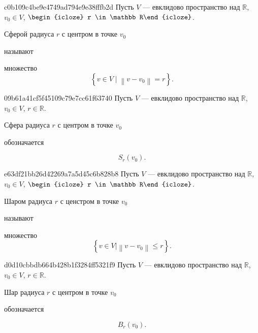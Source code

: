 \begin{note}{c0b109c4be9e4749ad794e9e38fffb2d}
    Пусть \({ V }\) --- евклидово пространство над \({ \mathbb R }\),\: \({ v_0 \in V }\),\: \({ \begin{icloze}{3}r \in \mathbb R\end{icloze} }\).
    \begin{icloze}{2}Сферой радиуса \({ r }\) с центром в точке \({ v_0 }\)\end{icloze} называют \begin{icloze}{1}множество
    \[
        \left\{ v \in V \mid \left\lVert v - v_0 \right\rVert = r \right\}.
    \]
\end{icloze}\end{note}

\begin{note}{09b61a41cf5f45109c79e7cc61f63740}
    Пусть \({ V }\) --- евклидово пространство над \({ \mathbb R }\),\: \({ v_0 \in V }\),\: \({ r \in \mathbb R }\).
    \begin{icloze}{2}Сфера радиуса \({ r }\) с центром в точке \({ v_0 }\)\end{icloze} обозначается
    \begin{icloze}{1}
        \[
            S_r (v_0).
        \]
    \end{icloze}
\end{note}

\begin{note}{e63df21bb26d42269a7a5d45c6b828b8}
    Пусть \({ V }\) --- евклидово пространство над \({ \mathbb R }\),\: \({ v_0 \in V }\),\: \({ \begin{icloze}{3}r \in \mathbb R\end{icloze} }\).
    \begin{icloze}{2}Шаром радиуса \({ r }\) с ценстром в точке  \({ v_0 }\)\end{icloze} называют \begin{icloze}{1}множество
        \[
            \left\{ v \in V | \left\lVert v - v_0 \right\rVert \leqslant r \right\}.
        \]
    \end{icloze}
\end{note}

\begin{note}{d0d10cbbdb664b428b1f3284ff5321f9}
    Пусть \({ V }\) --- евклидово пространство над \({ \mathbb R }\),\: \({ v_0 \in V }\),\: \({ r \in \mathbb R }\).
    \begin{icloze}{2}Шар радиуса \({ r }\) с центром в точке \({ v_0 }\)\end{icloze} обозначается
    \begin{icloze}{1}
        \[
            B_r (v_0).
        \]
    \end{icloze}
\end{note}

